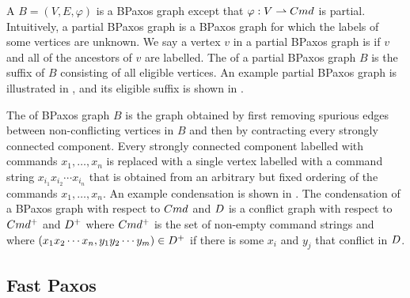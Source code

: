 A  $B = (V, E, \varphi)$ is a BPaxos graph except
that $\varphi: V \rightharpoonup Cmd$ is partial. Intuitively, a partial BPaxos
graph is a BPaxos graph for which the labels of some vertices are unknown.
%
We say a vertex $v$ in a partial BPaxos graph is  if $v$
and all of the ancestors of $v$ are labelled. The  of
a partial BPaxos graph $B$ is the suffix of $B$ consisting of all eligible
vertices.
%
An example partial BPaxos graph is illustrated in ,
and its eligible suffix is shown in .

{}

The  of BPaxos graph $B$ is the graph obtained by first
removing spurious edges between non-conflicting vertices in $B$ and then by
contracting every strongly connected component. Every strongly connected
component labelled with commands $x_1, \ldots, x_n$ is replaced with a single
vertex labelled with a command string $x_{i_1} x_{i_2} \cdots x_{i_n}$ that is
obtained from an arbitrary but fixed ordering of the commands $x_1, \ldots,
x_n$. An example condensation is shown in .
%
The condensation of a BPaxos graph with respect to $Cmd$ and $D$ is
a conflict graph with respect to $Cmd^+$ and $D^+$ where $Cmd^+$ is
the set of non-empty command strings and where $(x_1 x_2 \cdots x_n, y_1 y_2
\cdots y_m) \in D^+$ if there is some $x_i$ and $y_j$ that conflict in
$D$.

\subsection{Fast Paxos}

